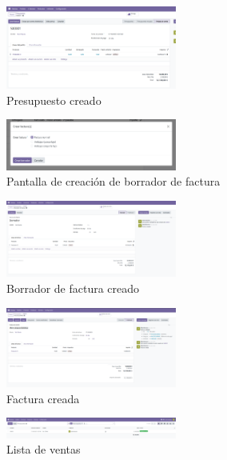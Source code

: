 \documentclass[a4paper,12pt]{article}
\begin{document}
\begin{figure}[h!]
    \centering
    \includegraphics[width=0.5\textwidth]{pr2odoo43-presupuestoCreado.png}
    \caption{Presupuesto creado}
\end{figure}
\FloatBarrier

\begin{figure}[h!]
    \centering
    \includegraphics[width=0.5\textwidth]{pr2odoo44-crearBorradorFactura.png}
    \caption{Pantalla de creación de borrador de factura}
\end{figure}
\FloatBarrier

\begin{figure}[h!]
    \centering
    \includegraphics[width=0.5\textwidth]{pr2odoo45-borradorCreado.png}
    \caption{Borrador de factura creado}
\end{figure}
\FloatBarrier

\begin{figure}[h!]
    \centering
    \includegraphics[width=0.5\textwidth]{pr2odoo46-facturaCreada.png}
    \caption{Factura creada}
\end{figure}
\FloatBarrier

\begin{figure}[h!]
    \centering
    \includegraphics[width=0.5\textwidth]{pr2odoo47-listaVentas.png}
    \caption{Lista de ventas}
\end{figure}
\FloatBarrier
\end{document}
